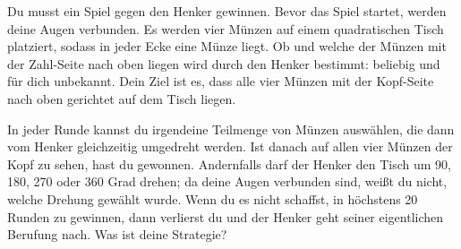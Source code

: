 \documentclass{uebung_cs}
\begin{document}
\begin{aufgabe}
    Du musst ein Spiel gegen den Henker gewinnen. Bevor das Spiel startet, werden deine Augen verbunden. Es werden vier Münzen auf einem quadratischen Tisch platziert, sodass in jeder Ecke eine Münze liegt. Ob und welche der Münzen mit der Zahl-Seite nach oben liegen wird durch den Henker bestimmt: beliebig und für dich unbekannt. Dein Ziel ist es, dass alle vier Münzen mit der Kopf-Seite nach oben gerichtet auf dem Tisch liegen.
    
    In jeder Runde kannst du irgendeine Teilmenge von Münzen auswählen, die dann vom Henker gleichzeitig umgedreht werden. Ist danach auf allen vier Münzen der Kopf zu sehen, hast du gewonnen. Andernfalls darf der Henker den Tisch um 90, 180, 270 oder 360 Grad drehen; da deine Augen verbunden sind, weißt du nicht, welche Drehung gewählt wurde. Wenn du es nicht schaffst, in höchstens 20 Runden zu gewinnen, dann verlierst du und der Henker geht seiner eigentlichen Berufung nach. Was ist deine Strategie?
\end{aufgabe}
\end{document}
